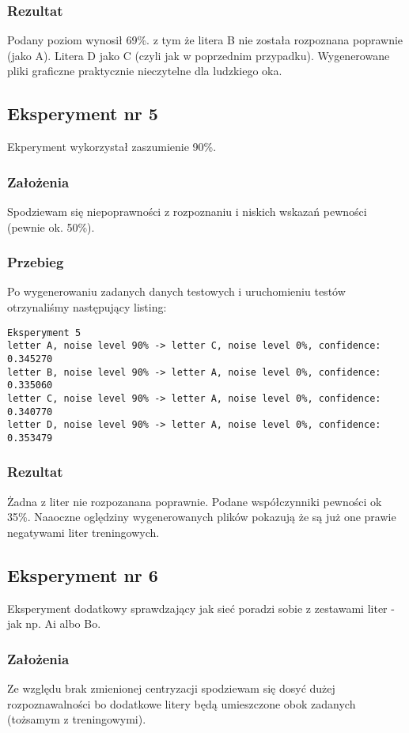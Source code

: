 \documentclass[12pt]{article}
\begin{document}
\subsubsection{Rezultat}
Podany poziom wynosił 69\%. z tym że litera B nie została rozpoznana poprawnie (jako A). Litera D jako C (czyli jak w poprzednim przypadku). Wygenerowane pliki graficzne praktycznie nieczytelne dla ludzkiego oka.

\subsection{Eksperyment nr 5}
Ekperyment wykorzystał zaszumienie 90\%.
\subsubsection{Założenia}
Spodziewam się niepoprawności z rozpoznaniu i niskich wskazań pewności (pewnie ok. 50\%).
\subsubsection{Przebieg}
Po wygenerowaniu zadanych danych testowych i uruchomieniu testów otrzynaliśmy następujący listing:
\begin{verbatim}
Eksperyment 5
letter A, noise level 90% -> letter C, noise level 0%, confidence: 0.345270
letter B, noise level 90% -> letter A, noise level 0%, confidence: 0.335060
letter C, noise level 90% -> letter A, noise level 0%, confidence: 0.340770
letter D, noise level 90% -> letter A, noise level 0%, confidence: 0.353479
\end{verbatim}
\subsubsection{Rezultat}
Żadna z liter nie rozpozanana poprawnie. Podane współczynniki pewności ok 35\%. Naaoczne oględziny wygenerowanych plików pokazują że są już one prawie negatywami liter treningowych.

\subsection{Eksperyment nr 6}
Eksperyment dodatkowy sprawdzający jak sieć poradzi sobie z zestawami liter - jak np. Ai albo Bo.

\subsubsection{Założenia}
Ze względu brak zmienionej centryzacji spodziewam się dosyć dużej rozpoznawalności bo dodatkowe litery będą umieszczone obok zadanych (tożsamym z treningowymi).
\end{document}
